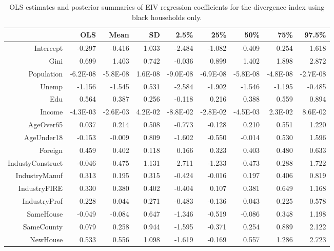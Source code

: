 \documentclass[12pt]{article}
\begin{document}
\begin{table}[ht]
\centering
\begin{tabular}{rrrrrrrrr}
  \hline
 & OLS & Mean & SD & 2.5\% & 25\% & 50\% & 75\% & 97.5\% \\ 
  \hline
Intercept & -0.297 & -0.416 & 1.033 & -2.484 & -1.082 & -0.409 & 0.254 & 1.618 \\ 
  Gini & 0.699 & 1.403 & 0.742 & -0.036 & 0.899 & 1.402 & 1.898 & 2.872 \\ 
  Population & -6.2E-08 & -5.8E-08 & 1.6E-08 & -9.0E-08 & -6.9E-08 & -5.8E-08 & -4.8E-08 & -2.7E-08 \\ 
  Unemp & -1.156 & -1.545 & 0.531 & -2.584 & -1.902 & -1.546 & -1.195 & -0.485 \\ 
  Edu & 0.564 & 0.387 & 0.256 & -0.118 & 0.216 & 0.388 & 0.559 & 0.894 \\ 
  Income & -4.3E-03 & -2.6E-03 & 4.2E-02 & -8.8E-02 & -2.8E-02 & -4.5E-03 & 2.3E-02 & 8.6E-02 \\ 
  AgeOver65 & 0.037 & 0.214 & 0.508 & -0.773 & -0.128 & 0.210 & 0.551 & 1.220 \\ 
  AgeUnder18 & -0.153 & -0.009 & 0.809 & -1.602 & -0.550 & -0.014 & 0.530 & 1.596 \\ 
  Foreign & 0.459 & 0.402 & 0.118 & 0.166 & 0.323 & 0.403 & 0.480 & 0.633 \\ 
  IndustyConstruct & -0.046 & -0.475 & 1.131 & -2.711 & -1.233 & -0.473 & 0.288 & 1.722 \\ 
  IndustryManuf & 0.313 & 0.195 & 0.315 & -0.424 & -0.016 & 0.197 & 0.406 & 0.819 \\ 
  IndustryFIRE & 0.330 & 0.380 & 0.402 & -0.404 & 0.107 & 0.381 & 0.649 & 1.168 \\ 
  IndustryProf & 0.228 & 0.044 & 0.271 & -0.483 & -0.136 & 0.043 & 0.225 & 0.578 \\ 
  SameHouse & -0.049 & -0.084 & 0.647 & -1.346 & -0.519 & -0.086 & 0.348 & 1.198 \\ 
  SameCounty & 0.079 & 0.258 & 0.944 & -1.595 & -0.371 & 0.254 & 0.889 & 2.122 \\ 
  NewHouse & 0.533 & 0.556 & 1.098 & -1.619 & -0.169 & 0.557 & 1.286 & 2.723 \\ 
   \hline
\end{tabular}
\caption{OLS estimates and posterior summaries of EIV regression coefficients for the divergence index using black households only.}
\label{tab:eiv.kl.raw.black}
\end{table}
\end{document}
